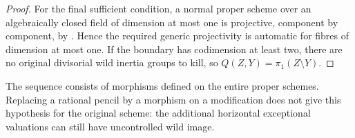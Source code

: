 \begin{proof}
For the final sufficient condition, a normal proper scheme
over an algebraically closed field of dimension at most one
is projective, component by component, by
\cite[Lemma 33.43.4, section 0A22]{C_StacksLogFibration}.
Hence the required
generic projectivity is automatic for fibres of dimension
at most one.  If the boundary has codimension at least two,
there are no original divisorial wild inertia groups to kill,
so $Q(Z,Y)=\pi_1(Z\setminus Y)$.
\end{proof}

\begin{remark}
The sequence consists of morphisms defined on the entire
proper schemes.  Replacing a rational pencil by a morphism
on a modification does not give this hypothesis for the
original scheme: the additional horizontal exceptional
valuations can still have uncontrolled wild image.
\end{remark}
